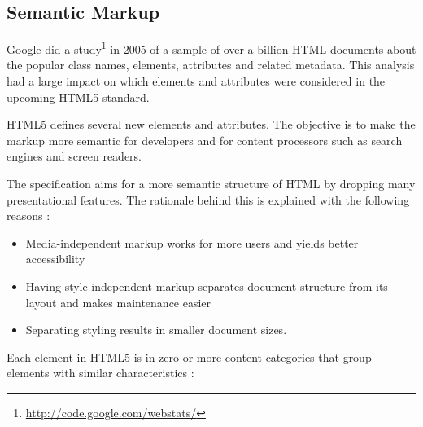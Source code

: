 \subsection{Semantic Markup}

Google did a study\footnote{\url{http://code.google.com/webstats/}} in
2005 of a sample of over a billion HTML documents about the popular
class names, elements, attributes and related metadata. This analysis
had a large impact on which elements and attributes were considered in
the upcoming HTML5 standard.

HTML5 defines several new elements and attributes. The objective is to
make the markup more semantic for developers and for content
processors such as search engines and screen readers.

The specification aims for a more semantic structure of HTML by
dropping many presentational features. The rationale behind this is
explained with the following reasons \cite{HTML5draft}:

\begin{itemize}
\item Media-independent markup works for more users and yields better
  accessibility
\item Having style-independent markup separates document structure
  from its layout and makes maintenance easier
\item Separating styling results in smaller document sizes.
\end{itemize}

\noindent Each element in HTML5 is in zero or more content categories
that group elements with similar characteristics \cite{HTML5draft}:

